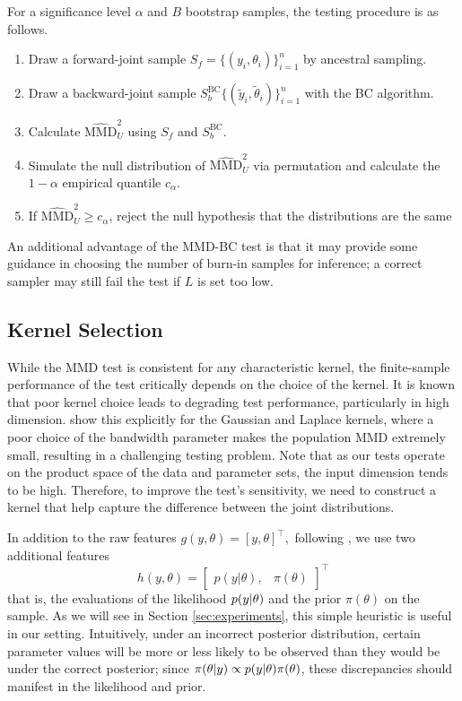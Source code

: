 \documentclass{article}
\begin{document}
For a significance level $\alpha$ and $B$ bootstrap samples, the testing procedure is as follows.
\begin{enumerate}
    \item Draw a forward-joint sample $S_f=\{(y_i,\theta_i)\}_{i=1}^n$ by ancestral sampling.
    \item Draw a backward-joint sample $S_{b}^{\mathrm{BC}}\{(\tilde{y}_i, \tilde{\theta}_{i})\}_{i=1}^{n}$ with the BC algorithm.
    \item Calculate $\widehat{\mathrm{MMD}}_{U}^{2}$ using $S_f$ and $S_b^{\mathrm{BC}}$.
    \item Simulate the null distribution of $\widehat{\mathrm{MMD}}_{U}^{2}$ via permutation and calculate the $1-\alpha$ empirical quantile $c_{\alpha}.$
    \item If $\widehat{\mathrm{MMD}}_{U}^{2} \geq c_{\alpha}$, reject the null hypothesis that the distributions are the same
\end{enumerate}

An additional advantage of the MMD-BC test is that it may provide some guidance in choosing the number of burn-in samples for inference; a correct sampler may still fail the test if $L$ is set too low.

\subsection{Kernel Selection}
While the MMD test is consistent for any characteristic kernel, the finite-sample performance of the test critically depends on the choice of the kernel. 
It is known that poor kernel choice leads to degrading test performance, particularly in high dimension. 
\cite{reddi_decreasing_2014} show this explicitly for the Gaussian and Laplace kernels, where a poor choice of the bandwidth parameter makes the population MMD extremely small, resulting in a challenging testing problem.
Note that as our tests operate on the product space of the data and parameter sets, the input dimension tends to be high.
Therefore, to improve the test's sensitivity, we need to construct a kernel that help capture the difference between the joint distributions.

In addition to the raw features $g(y, \theta)=[y,\theta]^\top,$ following \cite{gandy_unit_2020}, we use two additional features
\[h(y, \theta)=\begin{bmatrix}p(y|\theta), & \pi(\theta) \end{bmatrix}^{\top}\]
that is, the evaluations of the likelihood $p(y\vert\theta)$ and the prior $\pi(\theta)$ on the sample.
As we will see in Section \ref{sec:experiments}, this simple heuristic is useful in our setting. 
Intuitively, under an incorrect posterior distribution, certain parameter values will be more or less likely to be observed than they would be under the correct posterior; since $\pi(\theta|y) \propto p(y\vert \theta)\pi(\theta)$, these discrepancies should manifest in the likelihood and prior.
\end{document}
